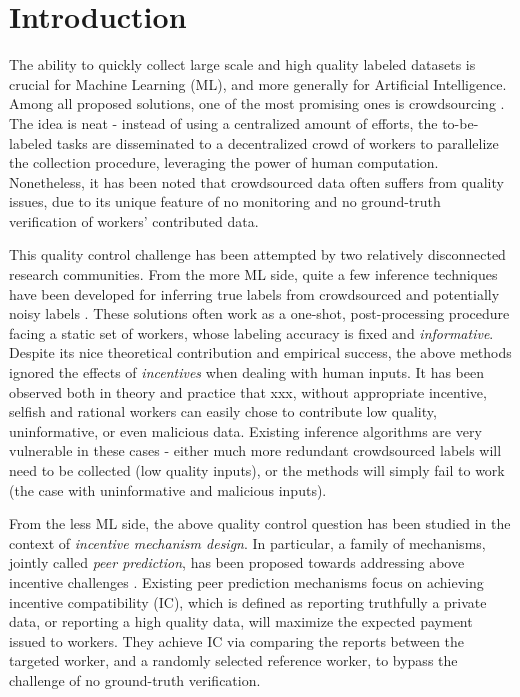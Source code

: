 \section{Introduction}
The ability to quickly collect large scale and high quality labeled datasets is crucial for Machine Learning (ML), and more generally for Artificial Intelligence. Among all proposed solutions, one of the most promising ones is crowdsourcing \cite{slivkins2014online,difallah2015dynamics,simpson2015language}. The idea is neat - instead of using a centralized amount of efforts, the to-be-labeled tasks are disseminated to a decentralized crowd of workers to parallelize the collection procedure, leveraging the power of human computation. Nonetheless, it has been noted that crowdsourced data often suffers from quality issues, due to its unique feature of no monitoring and no ground-truth verification of workers' contributed data. %

This quality control challenge has been attempted by two relatively disconnected research communities. From the more ML side, quite a few inference techniques have been developed for inferring true labels from crowdsourced and potentially noisy labels \cite{dawid1979maximum,raykar2010learning,liu2012variational,chen2015statistical,zheng2017truth}. These solutions often work as a one-shot, post-processing procedure facing a static set of workers, whose labeling accuracy is fixed and \emph{informative}. Despite its nice theoretical contribution and empirical success, the above methods ignored the effects of \emph{incentives} when dealing with human inputs. It has been observed both in theory and practice that {\color{red} xxx\cite{liu2017sequential}}, without appropriate incentive, selfish and rational workers can easily chose to contribute low quality, uninformative, or even malicious data. Existing inference algorithms are very vulnerable in these cases - either much more redundant crowdsourced labels will need to be collected (low quality inputs), or the methods will simply fail to work (the case with uninformative and malicious inputs). 

From the less ML side, the above quality control question has been studied in the context of \emph{incentive mechanism design}. In particular, a family of mechanisms, jointly called \emph{peer prediction}, has been proposed towards addressing above incentive challenges \cite{prelec2004bayesian,gneiting2007strictly,jurca2009mechanisms,witkowski2012peer,radanovic2013robust,dasgupta2013crowdsourced}. Existing peer prediction mechanisms focus on achieving incentive compatibility (IC), which is defined as reporting truthfully a private data, or reporting a high quality data, will maximize the expected payment issued to workers. They achieve IC via comparing the reports between the targeted worker, and a randomly selected reference worker, to bypass the challenge of no ground-truth verification.

